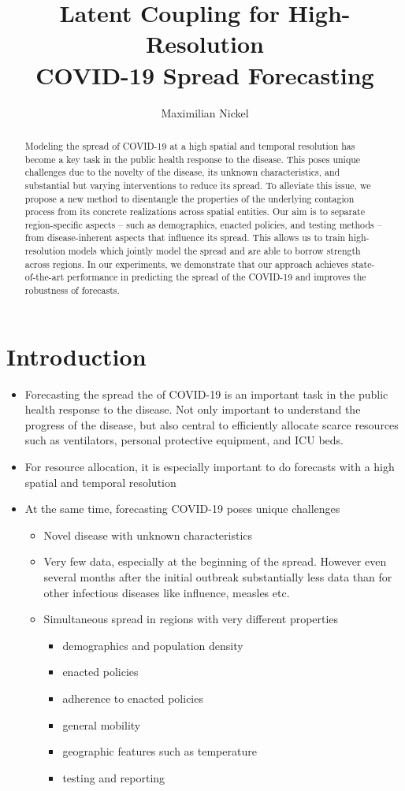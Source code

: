 \documentclass{article}
\author{Maximilian Nickel}
\date{}
\title{Latent Coupling for High-Resolution \\  COVID-19 Spread Forecasting}
\begin{document}
\maketitle
\author{}


\begin{abstract}
Modeling the spread of COVID-19 at a high spatial and temporal resolution has
become a key task in the public health response to the disease. This poses
unique challenges due to the novelty of the disease, its unknown
characteristics, and substantial but varying interventions to reduce its spread.
To alleviate this issue, we propose a new method to disentangle the properties
of the underlying contagion process from its concrete realizations across
spatial entities. Our aim is to separate region-specific aspects -- such as
demographics, enacted policies, and testing methods -- from disease-inherent
aspects that influence its spread. This allows us to train high-resolution
models which jointly model the spread and are able to borrow strength across
regions. In our experiments, we demonstrate that our approach achieves
state-of-the-art performance in predicting the spread of the COVID-19 and
improves the robustness of forecasts.
\end{abstract}

\section{Introduction}
\label{sec:org25bfe58}
\begin{itemize}
\item Forecasting the spread the of COVID-19 is an important task in the public
health response to the disease. Not only important to understand the progress
of the disease, but also central to efficiently allocate scarce resources such
as ventilators, personal protective equipment, and ICU beds.
\item For resource allocation, it is especially important to do forecasts with a
high spatial and temporal resolution
\item At the same time, forecasting COVID-19 poses unique challenges
\begin{itemize}
\item Novel disease with unknown characteristics
\item Very few data, especially at the beginning of the spread. However even
several months after the initial outbreak substantially less data than for other
infectious diseases like influence, measles etc.
\item Simultaneous spread in regions with very different properties
\begin{itemize}
\item demographics and population density
\item enacted policies
\item adherence to enacted policies
\item general mobility
\item geographic features such as temperature
\item testing and reporting
\end{itemize}
\end{itemize}
\end{itemize}
\end{document}
